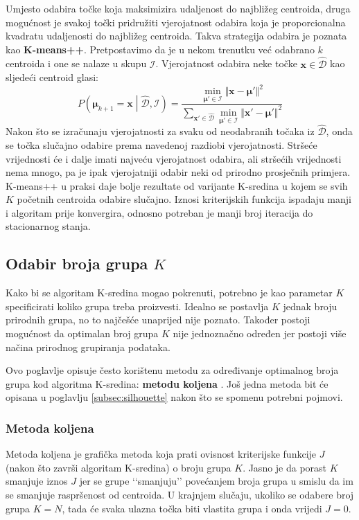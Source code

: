 \documentclass[times, utf8, zavrsni]{fer}
\begin{document}
Umjesto odabira točke koja maksimizira udaljenost do najbližeg centroida, druga mogućnost je svakoj točki pridružiti vjerojatnost odabira koja je proporcionalna kvadratu udaljenosti do najbližeg centroida. Takva strategija odabira je poznata kao \textbf{K-means++}.
Pretpostavimo da je u nekom trenutku već odabrano $k$ centroida i one se nalaze u skupu $\mathcal{I}$. Vjerojatnost odabira neke točke $\mathbf{x} \in \widehat{\mathcal{D}}$ kao sljedeći centroid glasi:
\[P \left( \boldsymbol{\mu}_{k+1} = \mathbf{x} \middle| \widehat{\mathcal{D}}, \mathcal{I}\right)
= \frac{\min_{\boldsymbol{\mu}' \in \mathcal{I}} \Vert \mathbf{x} - \boldsymbol{\mu}' \Vert^2}{\sum_{\mathbf{x}' \in \widehat{\mathcal{D}}} 
\min_{\boldsymbol{\mu}' \in \mathcal{I}} \Vert \mathbf{x}' - \boldsymbol{\mu}' \Vert^2}\]
Nakon što se izračunaju vjerojatnosti za svaku od neodabranih točaka iz $\widehat{\mathcal{D}}$, onda se točka slučajno odabire prema navedenoj razdiobi vjerojatnosti. Stršeće vrijednosti će i dalje imati najveću vjerojatnost odabira, ali stršećih vrijednosti nema mnogo, pa je ipak vjerojatniji odabir neki od prirodno prosječnih primjera.\\
K-means++ u praksi daje bolje rezultate od varijante K-sredina u kojem se svih $K$ početnih centroida odabire slučajno. Iznosi kriterijskih funkcija ispadaju manji i algoritam prije konvergira, odnosno potreban je manji broj iteracija do stacionarnog stanja.

\subsection{Odabir broja grupa $K$}
\label{subsection:odabirK}
Kako bi se algoritam K-sredina mogao pokrenuti, potrebno je kao parametar $K$ specificirati koliko grupa treba proizvesti. Idealno se postavlja $K$ jednak broju prirodnih grupa, no to najčešće unaprijed nije poznato. Također postoji mogućnost da optimalan broj grupa $K$ nije jednoznačno određen jer postoji više načina prirodnog grupiranja podataka.

Ovo poglavlje opisuje često korištenu metodu za određivanje optimalnog broja grupa kod algoritma K-sredina: \textbf{metodu koljena} . Još jedna metoda bit će opisana u poglavlju \ref{subsec:silhouette} nakon što se spomenu potrebni pojmovi.
\subsubsection{Metoda koljena}
Metoda koljena je grafička metoda koja prati ovisnost kriterijske funkcije $J$ (nakon što završi algoritam K-sredina) o broju grupa $K$. Jasno je da porast $K$ smanjuje iznos $J$ jer se grupe ‘‘smanjuju’’ povećanjem broja grupa u smislu da im se smanjuje raspršenost od centroida. U krajnjem slučaju, ukoliko se odabere broj grupa $K = N$, tada će svaka ulazna točka biti vlastita grupa i onda vrijedi $J = 0$.
\end{document}
